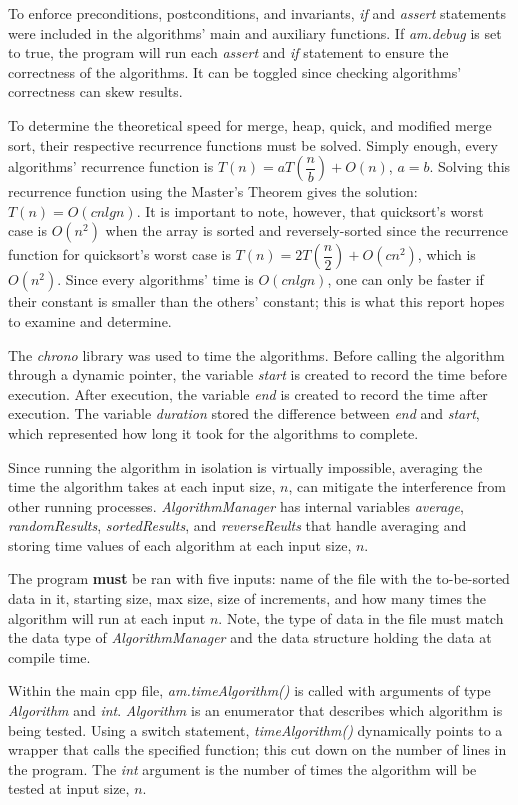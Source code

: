\documentclass[onecolumn, letterpaper, 12pt]{article}
\begin{document}
		To enforce preconditions, postconditions, and invariants, \textit{if} and \textit{assert} statements were included in the algorithms' main and auxiliary functions. If \textit{am.debug} is set to true, the program will run each \textit{assert} and \textit{if} statement to ensure the correctness of the algorithms. It can be toggled since checking algorithms' correctness can skew results.
		
		To determine the theoretical speed for merge, heap, quick, and modified merge sort, their respective recurrence functions must be solved. Simply enough, every algorithms' recurrence function is $T(n)=aT(\dfrac{n}{b}) + O(n)$, $a=b$. Solving this recurrence function using the Master's Theorem gives the solution: $T(n)=O(cnlgn)$. It is important to note, however, that quicksort's worst case is $O(n^2)$ when the array is sorted and reversely-sorted since the recurrence function for quicksort's worst case is $T(n)=2T(\dfrac{n}{2}) + O(cn^2)$, which is $O(n^2)$. Since every algorithms' time is $O(cnlgn)$, one can only be faster if their constant is smaller than the others' constant; this is what this report hopes to examine and determine.
		
		The \textit{chrono} library was used to time the algorithms. Before calling the algorithm through a dynamic pointer, the variable \textit{start} is created to record the time before execution. After execution, the variable \textit{end} is created to record the time after execution. The variable \textit{duration} stored the difference between \textit{end} and \textit{start}, which represented how long it took for the algorithms to complete.
		
		Since running the algorithm in isolation is virtually impossible, averaging the time the algorithm takes at each input size, $n$, can mitigate the interference from other running processes. \textit{AlgorithmManager} has internal variables \textit{average}, \textit{randomResults}, \textit{sortedResults}, and \textit{reverseReults} that handle averaging and storing time values of each algorithm at each input size, $n$.
		
		The program \textbf{must} be ran with five inputs: name of the file with the to-be-sorted data in it, starting size, max size, size of increments, and how many times the algorithm will run at each input $n$. Note, the type of data in the file must match the data type of \textit{AlgorithmManager} and the data structure holding the data at compile time.
		
		Within the main cpp file, \textit{am.timeAlgorithm()} is called with arguments of type \textit{Algorithm} and \textit{int}. \textit{Algorithm} is an enumerator that describes which algorithm is being tested. Using a switch statement, \textit{timeAlgorithm()} dynamically points to a wrapper that calls the specified function; this cut down on the number of lines in the program. The \textit{int} argument is the number of times the algorithm will be tested at input size, $n$.
		
\end{document}

